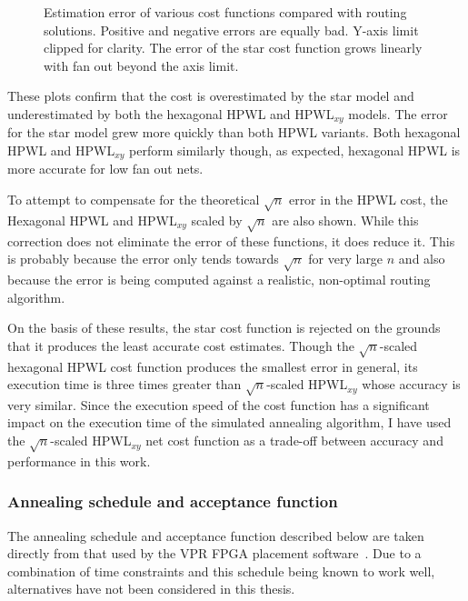 				\begin{figure}
					\center
					
					\caption[Estimation error of various cost functions.]%
					{Estimation error of various cost functions compared with
					routing solutions. Positive and negative errors are equally bad.
					Y-axis limit clipped for clarity. The error of the star cost function
					grows linearly with fan out beyond the axis limit.}
					\label{fig:cost-function-error}
				\end{figure}
				
				These plots confirm that the cost is overestimated by the star model
				and underestimated by both the hexagonal HPWL and HPWL${_{xy}}$ models.
				The error for the star model grew more quickly than both HPWL variants.
				Both hexagonal HPWL and HPWL$_{xy}$ perform similarly though, as
				expected, hexagonal HPWL is more accurate for low fan out nets.
				
				To attempt to compensate for the theoretical $\sqrt{n}$ error in the
				HPWL cost, the Hexagonal HPWL and HPWL$_{xy}$ scaled by $\sqrt{n}$ are
				also shown. While this correction does not eliminate the error of these
				functions, it does reduce it. This is probably because the error only
				tends towards $\sqrt{n}$ for very large $n$ \cite{chung79} and also
				because the error is being computed against a realistic, non-optimal
				routing algorithm.
				
				On the basis of these results, the star cost function is rejected on
				the grounds that it produces the least accurate cost estimates. Though
				the $\sqrt{n}$-scaled hexagonal HPWL cost function produces the
				smallest error in general, its execution time is three times greater
				than $\sqrt{n}$-scaled HPWL$_{xy}$ whose accuracy is very similar.
				Since the execution speed of the cost function has a significant impact
				on the execution time of the simulated annealing algorithm, I have used
				the $\sqrt{n}$-scaled HPWL$_{xy}$ net cost function as a trade-off
				between accuracy and performance in this work.
				
			\subsubsection{Annealing schedule and acceptance function}
				
				\label{sec:placement-schedule-acceptance}
				
				The annealing schedule and acceptance function described below are
				taken directly from that used by the VPR FPGA placement
				software~\cite{betz97}. Due to a combination of time constraints and
				this schedule being known to work well, alternatives have not been
				considered in this thesis.
				

